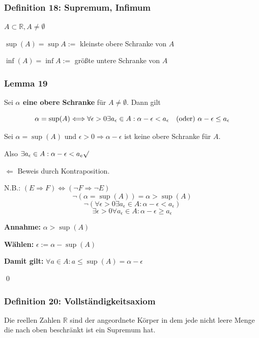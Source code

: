 \documentclass[fleqn]{scrartcl}
\newcommand{\qq}[1]{\glqq #1\grqq}
\renewenvironment{proof}{{\bfseries Beweis }}{\qed}
\begin{document}
\subsubsection{Definition 18: Supremum, Infimum}

$A \subset \mathbb{R}, A \neq \emptyset$

$\sup(A)=\sup A := $ kleinste obere Schranke von $A$

$\inf(A)=\inf A := $ größte untere Schranke von $A$

\subsubsection{Lemma 19}

Sei \textbf{$\alpha$ eine obere Schranke} für $A \neq \emptyset$. Dann gilt

\[\alpha = \sup(A) \Longleftrightarrow \forall \epsilon > 0 \exists a_{\epsilon} \in A : \alpha - \epsilon < a_{\epsilon} \text{\quad(oder) } \alpha - \epsilon \leq a_{\epsilon}\]

\begin{proof}

Sei $\alpha = \sup(A)$ und $\epsilon > 0 \Longrightarrow \alpha - \epsilon$ ist keine obere Schranke für $A$.

Also $\exists a_{\epsilon} \in A: \alpha -\epsilon < a_e\surd$

\qq{$\Longleftarrow$} Beweis durch Kontraposition.

N.B.: $(E \Longrightarrow F) \Longleftrightarrow (\lnot F \Longrightarrow \lnot E)$
\[\lnot (\alpha = \sup(A))= \alpha > \sup(A) \]
\[\lnot (\forall \epsilon > 0 \exists a_{\epsilon} \in A:\alpha -\epsilon < a_{\epsilon}) \]
\[\exists \epsilon > 0 \boxed{\forall a_{\epsilon} \in A:\alpha -\epsilon \geq a_{\epsilon}}\]

\textbf{Annahme:} $\alpha > \sup(A)$

\textbf{Wählen:} $\epsilon:=\alpha-\sup(A)$

\textbf{Damit gilt:} $\forall a \in A : a \leq \sup(A) = \alpha - \epsilon$  

\end{proof}

\subsubsection{Definition 20: Vollständigkeitsaxiom}

Die reellen Zahlen $\mathbb{R}$ sind der angeordnete Körper in dem jede nicht leere Menge die nach oben beschränkt ist ein Supremum hat.
\end{document}

